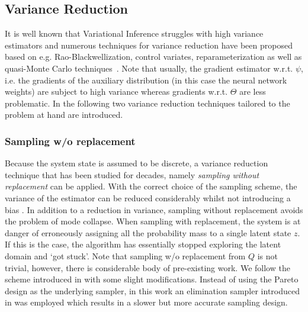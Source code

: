 \subsection{Variance Reduction}
\label{sec:var_reduc}

It is well known that Variational Inference struggles with high variance estimators and numerous techniques for variance reduction have been proposed based on e.g. Rao-Blackwellization, control variates, reparameterization as well as quasi-Monte Carlo techniques~\cite{buchholz2018quasi}. Note that usually, the gradient estimator w.r.t. $\psi$, i.e. the gradients of the auxiliary distribution (in this case the neural network weights) are subject to high variance whereas gradients w.r.t. $\Theta$ are less problematic. In the following two variance reduction techniques tailored to the problem at hand are introduced.

\subsubsection{Sampling w/o replacement}
Because the system state is assumed to be discrete, a variance reduction technique that has been studied for decades, namely \emph{sampling without replacement} can be applied. With the correct choice of the sampling scheme, the variance of the estimator can be reduced considerably whilst not introducing a bias \cite{horvitz1952generalization}. In addition to a reduction in variance, sampling without replacement avoids the problem of mode collapse. When sampling with replacement, the system is at danger of erroneously assigning all the probability mass to a single latent state $z$. If this is the case, the algorithm has essentially stopped exploring the latent domain and `got stuck'. Note that sampling w/o replacement from $Q$ is not trivial, however, there is considerable body of pre-existing work. We follow the scheme introduced in \cite{shah2018without} with some slight modifications. Instead of using the Pareto design as the underlying sampler, in this work an elimination sampler introduced in \cite{deville1998unequal} was employed which results in a slower but more accurate sampling design.

